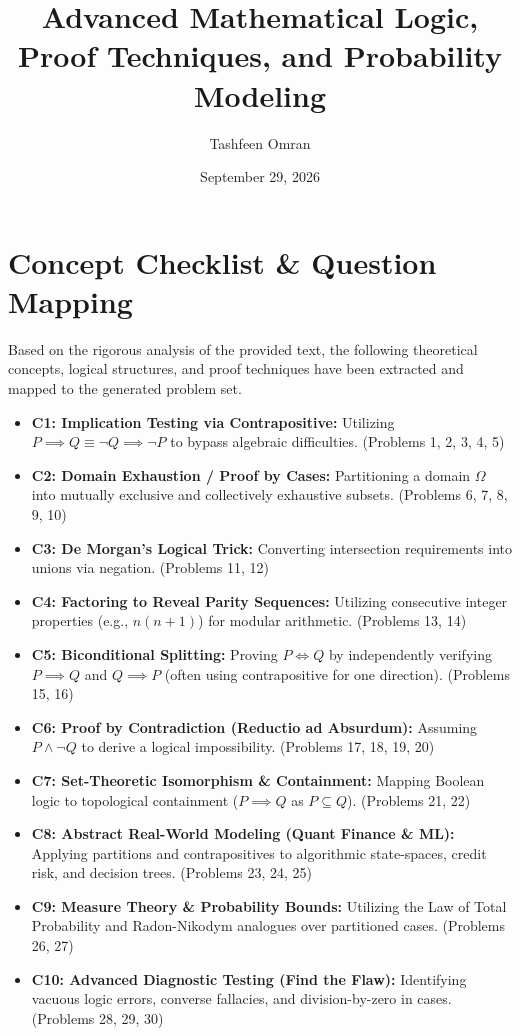 \documentclass[11pt]{article}
\title{\textbf{Advanced Mathematical Logic, Proof Techniques, and Probability Modeling}}
\author{Tashfeen Omran}
\date{September 29, 2026}
\begin{document}
\maketitle

\tableofcontents
\newpage

\section{Concept Checklist \& Question Mapping}
\label{sec:checklist_start}

Based on the rigorous analysis of the provided text, the following theoretical concepts, logical structures, and proof techniques have been extracted and mapped to the generated problem set.

\begin{itemize}
    \item \textbf{C1: Implication Testing via Contrapositive:} Utilizing $P \implies Q \equiv \neg Q \implies \neg P$ to bypass algebraic difficulties. (Problems 1, 2, 3, 4, 5)
    \item \textbf{C2: Domain Exhaustion / Proof by Cases:} Partitioning a domain $\Omega$ into mutually exclusive and collectively exhaustive subsets. (Problems 6, 7, 8, 9, 10)
    \item \textbf{C3: De Morgan's Logical Trick:} Converting intersection requirements into unions via negation. (Problems 11, 12)
    \item \textbf{C4: Factoring to Reveal Parity Sequences:} Utilizing consecutive integer properties (e.g., $n(n+1)$) for modular arithmetic. (Problems 13, 14)
    \item \textbf{C5: Biconditional Splitting:} Proving $P \iff Q$ by independently verifying $P \implies Q$ and $Q \implies P$ (often using contrapositive for one direction). (Problems 15, 16)
    \item \textbf{C6: Proof by Contradiction (Reductio ad Absurdum):} Assuming $P \land \neg Q$ to derive a logical impossibility. (Problems 17, 18, 19, 20)
    \item \textbf{C7: Set-Theoretic Isomorphism \& Containment:} Mapping Boolean logic to topological containment ($P \implies Q$ as $P \subseteq Q$). (Problems 21, 22)
    \item \textbf{C8: Abstract Real-World Modeling (Quant Finance \& ML):} Applying partitions and contrapositives to algorithmic state-spaces, credit risk, and decision trees. (Problems 23, 24, 25)
    \item \textbf{C9: Measure Theory \& Probability Bounds:} Utilizing the Law of Total Probability and Radon-Nikodym analogues over partitioned cases. (Problems 26, 27)
    \item \textbf{C10: Advanced Diagnostic Testing (Find the Flaw):} Identifying vacuous logic errors, converse fallacies, and division-by-zero in cases. (Problems 28, 29, 30)
\end{itemize}
\end{document}
